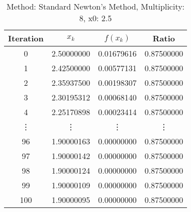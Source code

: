 \begin{table}
\centering
\caption{Method: Standard Newton's Method, Multiplicity: 8, x0: 2.5}
\label{tab:table_Standard_Newton's_Method_8_2_5}
\begin{tabular}{c c c c}
\toprule
Iteration &      $x_k$ &   $f(x_k)$ &      Ratio \\
\midrule
        0 & 2.50000000 & 0.01679616 & 0.87500000 \\
        1 & 2.42500000 & 0.00577131 & 0.87500000 \\
        2 & 2.35937500 & 0.00198307 & 0.87500000 \\
        3 & 2.30195312 & 0.00068140 & 0.87500000 \\
        4 & 2.25170898 & 0.00023414 & 0.87500000 \\
   \vdots &     \vdots &     \vdots &     \vdots \\
       96 & 1.90000163 & 0.00000000 & 0.87500000 \\
       97 & 1.90000142 & 0.00000000 & 0.87500000 \\
       98 & 1.90000124 & 0.00000000 & 0.87500000 \\
       99 & 1.90000109 & 0.00000000 & 0.87500000 \\
      100 & 1.90000095 & 0.00000000 & 0.87500000 \\
\bottomrule
\end{tabular}
\end{table}
